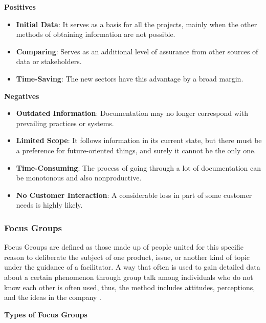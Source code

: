 \documentclass[conference]{IEEEtran}
\begin{document}
\textbf{Positives}

\begin{itemize}
    \item \textbf{Initial Data}: It serves as a basis for all the projects, mainly when the other methods of obtaining information are not possible.
    \item \textbf{Comparing}: Serves as an additional level of assurance from other sources of data or stakeholders.
    \item \textbf{Time-Saving}: The new sectors have this advantage by a broad margin.
\end{itemize}

\textbf{Negatives}

\begin{itemize}
    \item \textbf{Outdated Information}: Documentation may no longer correspond with prevailing practices or systems.
    \item \textbf{Limited Scope}: It follows information in its current state, but there must be a preference for future-oriented things, and surely it cannot be the only one.
    \item \textbf{Time-Consuming}: The process of going through a lot of documentation can be monotonous and also nonproductive.
    \item \textbf{No Customer Interaction}: A considerable loss in part of some customer needs is highly likely.
\end{itemize}

\subsubsection{Focus Groups}

Focus Groups are defined as those made up of people united for this specific reason to deliberate the subject of one product, issue, or another kind of topic under the guidance of a facilitator. A way that often is used to gain detailed data about a certain phenomenon through group talk among individuals who do not know each other is often used, thus, the method includes attitudes, perceptions, and the ideas in the company \cite{cite14}.

\textbf{Types of Focus Groups}
\end{document}
